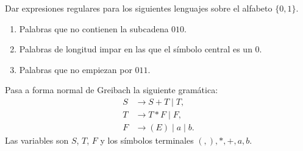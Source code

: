 \documentclass[12pt]{article}
\begin{document}
    \begin{ejercicio}[2.5 puntos]
        Dar expresiones regulares para los siguientes lenguajes sobre el alfabeto $\{0, 1\}$.
        \begin{enumerate}
            \item Palabras que no contienen la subcadena $010$.
            \item Palabras de longitud impar en las que el símbolo central es un $0$.
            \item Palabras que no empiezan por $011$.
        \end{enumerate}
    \end{ejercicio}

    \begin{ejercicio}[2.5 puntos]
        Pasa a forma normal de Greibach la siguiente gramática:
        \begin{align*}
            S &\to S + T \mid T, \\
            T &\to T * F \mid F, \\
            F &\to (E) \mid a \mid b.
        \end{align*}
        Las variables son $S$, $T$, $F$ y los símbolos terminales $(, ), *, +, a, b$.
    \end{ejercicio}
\end{document}
